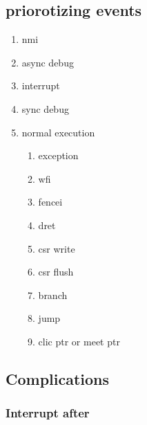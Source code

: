\subsection{priorotizing events}

\begin{enumerate}
    \item nmi
    \item async debug
    \item interrupt
    \item sync debug
    \item normal execution
    \begin{enumerate}
        \item exception
        \item wfi
        \item fencei
        \item dret
        \item csr write
        \item csr flush
        \item branch
        \item jump
        \item clic ptr or meet ptr
    \end{enumerate}
\end{enumerate}

\subsection{Complications}

\subsubsection{Interrupt after }